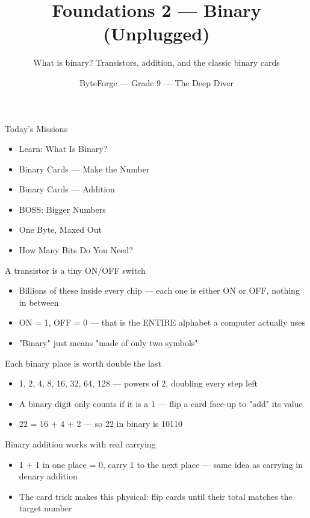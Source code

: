 \documentclass[aspectratio=169]{beamer}
\title{Foundations 2 — Binary (Unplugged)}
\subtitle{What is binary? Transistors, addition, and the classic binary cards}
\author{ByteForge --- Grade 9 --- The Deep Diver}
\date{}
\begin{document}
\begin{frame}
    \titlepage
\end{frame}

\begin{frame}{Today's Missions}
    \Large
    \begin{itemize}
        \item Learn: What Is Binary?
        \item Binary Cards --- Make the Number
        \item Binary Cards --- Addition
        \item BOSS: Bigger Numbers
        \item One Byte, Maxed Out
        \item How Many Bits Do You Need?
    \end{itemize}
\end{frame}

\begin{frame}{A transistor is a tiny ON/OFF switch}
    \large
    \begin{itemize}
        \item Billions of these inside every chip --- each one is either ON or OFF, nothing in between
        \item ON = 1, OFF = 0 --- that is the ENTIRE alphabet a computer actually uses
        \item "Binary" just means "made of only two symbols"
    \end{itemize}
\end{frame}


\begin{frame}{Each binary place is worth double the last}
    \large
    \begin{itemize}
        \item 1, 2, 4, 8, 16, 32, 64, 128 --- powers of 2, doubling every step left
        \item A binary digit only counts if it is a 1 --- flip a card face-up to "add" its value
        \item 22 = 16 + 4 + 2 --- so 22 in binary is 10110
    \end{itemize}
\end{frame}


\begin{frame}{Binary addition works with real carrying}
    \large
    \begin{itemize}
        \item 1 + 1 in one place = 0, carry 1 to the next place --- same idea as carrying in denary addition
        \item The card trick makes this physical: flip cards until their total matches the target number
    \end{itemize}
\end{frame}
\end{document}
